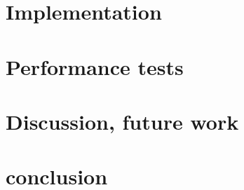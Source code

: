 \documentclass[11pt]{article}
\begin{document}
\section{Implementation}

\section{Performance tests}

\section{Discussion, future work}
% 

\section{conclusion}
\end{document}
